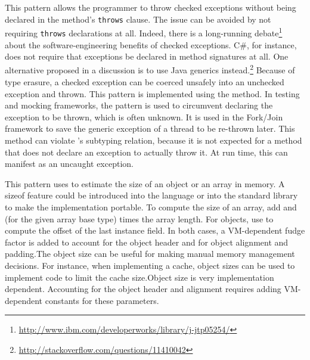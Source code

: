 %
{This pattern allows the programmer to throw checked exceptions without being
declared in the method's \texttt{throws} clause.}
{The issue can be avoided by not requiring \texttt{throws} declarations at
  all. Indeed, there is a long-running
  debate\footnote{\url{http://www.ibm.com/developerworks/library/j-jtp05254/}} about the
  software-engineering benefits of checked exceptions.
C\#, for instance, does not require that exceptions be declared in method signatures at all.
One alternative proposed in a \stackoverflow
discussion is to use Java generics
instead.\footnote{\url{http://stackoverflow.com/questions/11410042}} Because
of type erasure, a checked exception can be coerced unsafely into an unchecked exception and thrown.
}
{This pattern is implemented using the  method.}
{In testing and mocking frameworks, the pattern is used to circumvent declaring
  the exception to be thrown, which is often unknown.
It is used in the \java{} Fork/Join framework to save the generic exception of a thread to be re-thrown later.}
{This method can violate \java{}'s subtyping
  relation, because it is not expected
  for a method that does not declare an exception to actually throw it. At
  run time, this can manifest as an uncaught exception.}

\newcommand\foundinsize{4}
\newcommand\usedbysize{3003}
\newcommand\mostusedsize{\sizemost}
\newcommand\memberssize{\member{array\-Base\-Offset}, \member{array\-Index\-Scale},
\member{object\-Field\-Offset}}
\newcommand\namesize{Get the Size of an Object or an Array}

%
{This pattern uses \smu{} to estimate the size of an object or an array in
memory.}
{A sizeof feature could be introduced into the language or
into the standard library to make the implementation portable.}
{To compute the size of an array, add  and
 (for the given array base type) times the array
length. For objects, use  to compute the offset
of the last instance field. In both cases, a VM-dependent fudge factor is
added to account for the object header and for object alignment and padding.}{The object
size can be useful for making manual memory management decisions. For
instance, when implementing a cache, object sizes can be used to implement
code to limit the cache size.}{Object
size is very implementation dependent. Accounting for the object header and
alignment requires adding VM-dependent constants for these parameters.}

